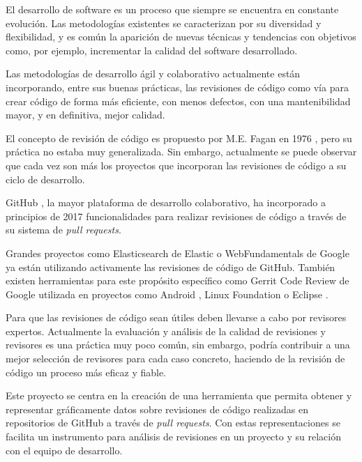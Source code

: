 
El desarrollo de software es un proceso que siempre se encuentra en constante evolución. Las metodologías existentes se caracterizan por su diversidad y flexibilidad, y es común la aparición de nuevas técnicas y tendencias con objetivos como, por ejemplo, incrementar la calidad del software desarrollado.

Las metodologías de desarrollo ágil y colaborativo actualmente están incorporando, entre sus buenas prácticas, las revisiones de código como vía para crear código de forma más eficiente, con menos defectos, con una mantenibilidad mayor, y en definitiva, mejor calidad.

El concepto de revisión de código es propuesto por M.E. Fagan en 1976 \cite{5388086}, pero su práctica no estaba muy generalizada. Sin embargo, actualmente se puede observar que cada vez son más los proyectos que incorporan las revisiones de código a su ciclo de desarrollo.

GitHub \cite{github:home}, la mayor plataforma de desarrollo colaborativo, ha incorporado a principios de 2017 funcionalidades para realizar revisiones de código a través de su sistema de \emph{pull requests}.

Grandes proyectos como Elasticsearch \cite{elastic:elasticsearch} de Elastic o WebFundamentals \cite{google:webfundamentals} de Google ya están utilizando activamente las revisiones de código de GitHub. También existen herramientas para este propósito específico como Gerrit Code Review \cite{gerrit:home} de Google utilizada en proyectos como Android \cite{android:home}, Linux Foundation \cite{linuxfoundation:home} o Eclipse \cite{eclipse:home}.

Para que las revisiones de código sean útiles deben llevarse a cabo por revisores expertos. Actualmente la evaluación y análisis de la calidad de revisiones y revisores es una práctica muy poco común, sin embargo, podría contribuir a una mejor selección de revisores para cada caso concreto, haciendo de la revisión de código un proceso más eficaz y fiable.


Este proyecto se centra en la creación de una herramienta que permita obtener y representar gráficamente datos sobre revisiones de código realizadas en repositorios de GitHub a través de \emph{pull requests}. Con estas representaciones se facilita un instrumento para análisis de revisiones en un proyecto y su relación con el equipo de desarrollo.

